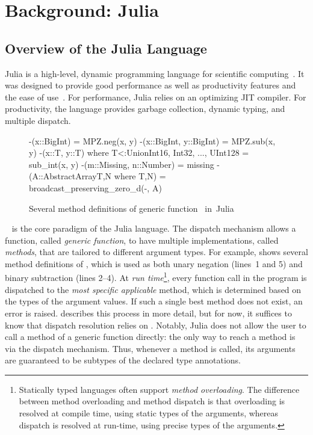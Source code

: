 \chapter{Background: Julia}\label{chap:2}

\section{Overview of the Julia Language}

Julia is a high-level, dynamic programming language for scientific computing~\cite{TODO}.
It was designed to provide good performance as well as productivity features and
the ease of use~\cite{TODO}.
For performance, Julia relies on an optimizing JIT compiler.
For productivity, the language provides garbage collection, dynamic typing, and
multiple dispatch. 

\begin{figure}[t]
\begin{julia}
-(x::BigInt) = MPZ.neg(x, y)
-(x::BigInt, y::BigInt) = MPZ.sub(x, y)
-(x::T, y::T) where T<:Union{Int16, Int32, ..., UInt128} = sub_int(x, y)
-(m::Missing, n::Number) = missing
-(A::AbstractArray{T,N} where {T,N}) = broadcast_preserving_zero_d(-, A)
\end{julia}
\caption{Several method definitions of generic function~\cjl{(-)}
in~Julia}\label{fig:code:subtraction}
\end{figure}

~\cite{TODO} is the core paradigm of the Julia
language. The dispatch mechanism allows a function, called \emph{generic
function}, to have multiple implementations, called \emph{methods}, that are
tailored to different argument types. For example, 
shows several method definitions of \cjl{(-)}, which is used as both unary
negation (lines~1 and 5) and binary subtraction (lines 2--4).
At \emph{run time}\footnote{Statically typed languages often support
\emph{method overloading}. The difference between method overloading and method
dispatch is that overloading is resolved at compile time, using static types of
the arguments, whereas dispatch is resolved at run-time, using precise types
of the arguments.},
every function call in the program is dispatched to the
\emph{most specific applicable} method, which is determined based on the
types of the argument values. If such a single best method does not exist,
an error is raised.
 describes this process in more detail, but for now,
it suffices to know that dispatch resolution relies on .
Notably, Julia does not allow the user to call a method of a generic function
directly: the only way to reach a method is via the dispatch mechanism.
Thus, whenever a method is called, its arguments are guaranteed to be
subtypes of the declared type annotations.

